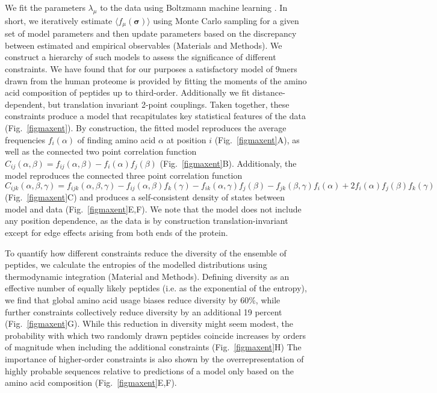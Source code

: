 \documentclass[superscriptaddress,twocolumn,pre]{revtex4}
\newcommand{\B}{\boldsymbol}
\newcommand{\<}{\langle}
\renewcommand{\>}{\rangle}
\begin{document}
We fit the parameters $\lambda_\mu$ to the data using Boltzmann machine learning \cite{Ackley1985}. In short, we iteratively estimate $\langle f_\mu(\B \sigma)\rangle$ using Monte Carlo sampling for a given set of model parameters and then update parameters based on the discrepancy between estimated and empirical observables (Materials and Methods).
We construct a hierarchy of such models to assess the significance of different constraints. We have found that for our purposes a satisfactory model of 9mers drawn from the human proteome is provided by fitting the moments of the amino acid composition of peptides up to third-order. Additionally we fit distance-dependent, but translation invariant 2-point couplings. Taken together, these constraints produce a model that recapitulates key statistical features of the data (Fig.~\ref{figmaxent}). By construction, the fitted model reproduces the average frequencies $f_i(\alpha)$ of finding amino acid $\alpha$ at position $i$ (Fig.~\ref{figmaxent}A), as well as the connected two point correlation function $C_{ij}(\alpha, \beta) = f_{ij}(\alpha, \beta) - f_i(\alpha) f_j(\beta)$ (Fig.~\ref{figmaxent}B). Additionaly, the model reproduces the connected three point correlation function $C_{ijk}(\alpha, \beta, \gamma) = f_{ijk}(\alpha, \beta, \gamma) - f_{ij}(\alpha, \beta) f_k(\gamma) - f_{ik}(\alpha, \gamma) f_j(\beta) - f_{jk}(\beta, \gamma) f_i(\alpha) + 2 f_i(\alpha) f_j(\beta) f_k(\gamma)$ (Fig.~\ref{figmaxent}C) and produces a self-consistent density of states between model and data (Fig.~\ref{figmaxent}E,F).
We note that the model does not include any position dependence, as the data is by construction translation-invariant except for edge effects arising from both ends of the protein. 

To quantify how different constraints reduce the diversity of the ensemble of peptides, we calculate the entropies of the modelled distributions using thermodynamic integration (Material and Methods). Defining diversity as an effective number of equally likely peptides (i.e. as the exponential of the entropy), we find that global amino acid usage biases reduce diversity by 60\%, while further constraints collectively reduce diversity by an additional 19 percent (Fig.~\ref{figmaxent}G). While this reduction in diversity might seem modest, the probability with which two randomly drawn peptides coincide increases by orders of magnitude when including the additional constraints (Fig.~\ref{figmaxent}H)
The importance of higher-order constraints is also shown by the overrepresentation of highly probable sequences relative to predictions of a model only based on the amino acid composition (Fig.~\ref{figmaxent}E,F).
\end{document}
